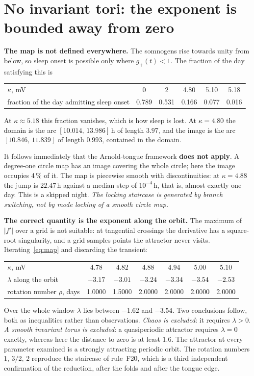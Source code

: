\documentclass[11pt,a4paper]{article}
\begin{document}
\section{No invariant tori: the exponent is bounded away from zero}
\textbf{The map is not defined everywhere.} The somnogens rise towards unity from below, so sleep
onset is possible only where $g_+(t)<1$. The fraction of the day satisfying this is
\begin{center}\small
\begin{tabular}{lccccc}
\toprule
$\kappa$, mV & 0 & 2 & 4.80 & 5.10 & 5.18\\
fraction of the day admitting sleep onset & 0.789 & 0.531 & 0.166 & 0.077 & 0.016\\
\bottomrule
\end{tabular}
\end{center}
At $\kappa\approx5.18$ this fraction vanishes, which is how sleep is lost. At $\kappa=4.80$ the
domain is the arc $[10.014,\,13.986]$\,h of length $3.97$, and the image is the arc
$[10.846,\,11.839]$ of length $0.993$, contained in the domain.

It follows immediately that the Arnold-tongue framework \textbf{does not apply}. A degree-one circle
map has an image covering the whole circle; here the image occupies 4\,\% of it. The map is
piecewise smooth with discontinuities: at $\kappa=4.88$ the jump is $22.47$\,h against a median step
of $10^{-4}$\,h, that is, almost exactly one day. This is a skipped night. \emph{The locking
staircase is generated by branch switching, not by mode locking of a smooth circle map.}

\textbf{The correct quantity is the exponent along the orbit.} The maximum of $|f'|$ over a grid is
not suitable: at tangential crossings the derivative has a square-root singularity, and a grid
samples points the attractor never visits. Iterating~\eqref{eq:map} and discarding the transient:
\begin{center}\small
\begin{tabular}{lcccccc}
\toprule
$\kappa$, mV & 4.78 & 4.82 & 4.88 & 4.94 & 5.00 & 5.10\\
$\lambda$ along the orbit & $-3.17$ & $-3.01$ & $-3.24$ & $-3.34$ & $-3.54$ & $-2.53$\\
rotation number $\rho$, days & 1.0000 & 1.5000 & 2.0000 & 2.0000 & 2.0000 & 2.0000\\
\bottomrule
\end{tabular}
\end{center}
Over the whole window $\lambda$ lies between $-1.62$ and $-3.54$. Two conclusions follow, both as
inequalities rather than observations. \emph{Chaos is excluded}: it requires $\lambda>0$. \emph{A
smooth invariant torus is excluded}: a quasiperiodic attractor requires $\lambda=0$ exactly, whereas
here the distance to zero is at least $1.6$. The attractor at every parameter examined is a strongly
attracting periodic orbit. The rotation numbers $1$, $3/2$, $2$ reproduce the staircase of rule~F20,
which is a third independent confirmation of the reduction, after the folds and after the tongue
edge.
\end{document}
